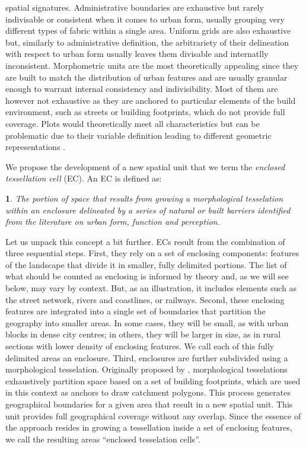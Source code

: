 spatial signatures.
%
Administrative boundaries are exhaustive but rarely indivisable or consistent
when it comes to urban form, usually grouping very different types of fabric
within a single area.
%
Uniform grids are also exhaustive but, similarly to administrative definition,
the arbitrariety of their delineation with respect to urban form usually
leaves them divisable and internatlly inconsistent.
%
Morphometric units are the most theoretically appealing since they are built
to match the distribution of urban features and are usually granular enough to
warrant internal consistency and indivisibility. Most of them are however not
exhaustive as they are anchored to particular elements of the build
environment, such as streets or building footprints, which do not provide full
coverage. Plots would theoretically meet all characteristics but can be problematic due to their variable definition leading to different geometric representations \citep{kropf2018plots}.

We propose the development of a new spatial unit that we term the
\textit{enclosed tessellation cell} (EC).
An EC is defined as:
\newtheorem*{theorem}{}
\begin{theorem}
        The portion of space that results from growing a
morphological tesselation within an
enclosure delineated by a series of natural or built barriers identified from the
literature on urban form, function and perception.
\end{theorem}
Let us unpack this concept a bit further. ECs result from the combination of
three sequential steps.
First, they rely on a set of enclosing
components: features of the landscape that divide it in smaller,
fully delimited portions. The list of what should be counted as enclosing is
informed by theory and, as we will see below, may vary by context. But, as an
illustration, it includes elements such as the street network, rivers and
coastlines, or railways.
Second, these enclosing features are integrated into a single set of
boundaries that partition the geography into smaller areas. In some cases,
they will be small, as with urban blocks in dense city
centres; in others, they will be larger in size, as in rural sections with
lower density of enclosing features. We call each of this fully delimited
areas an enclosure.
Third, enclosures are further subdivided using a morphological tesselation.
Originally proposed by \citep{fleischmann2020morphological}, morphological
tesselations exhaustively partition space based on a set of building
footprints, which are used in this context as anchors to draw catchment
polygons.
This process generates geographical boundaries for a given area that
result in a new spatial unit. This unit provides full geographical coverage
without any overlap.
%
Since the essence of the approach resides in growing a tessellation inside a
set of enclosing features, we call the resulting areas ``enclosed
tesselation cells''.

